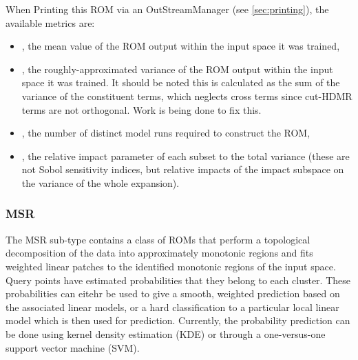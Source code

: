 When Printing this ROM via an OutStreamManager (see \ref{sec:printing}), the available metrics are:
\begin{itemize}
  \item {}, the mean value of the ROM output within the input space it was trained,
  \item {}, the roughly-approximated variance of the ROM output within the input space it
    was trained.  It should be noted this is calculated as the sum of the variance of the constituent terms,
    which neglects cross terms since cut-HDMR terms are not orthogonal.  Work is being done to fix this.
  \item {}, the number of distinct model runs required to construct the ROM,
  \item {}, the relative impact parameter of each subset to the total
    variance (these are not Sobol sensitivity indices, but relative impacts of the impact subspace on the
    variance of the whole expansion).
\end{itemize}

\subsubsection{MSR}
\label{subsubsec:MSR}
The MSR sub-type contains a class of ROMs that perform a topological
decomposition of the data into approximately monotonic regions and fits weighted
linear patches to the identified monotonic regions of the input space. Query
points have estimated probabilities that they belong to each cluster. These
probabilities can eitehr be used to give a smooth, weighted prediction based on
the associated linear models, or a hard classification to a particular local
linear model which is then used for prediction. Currently, the probability
prediction can be done using kernel density estimation (KDE) or through a
one-versus-one support vector machine (SVM).
%

